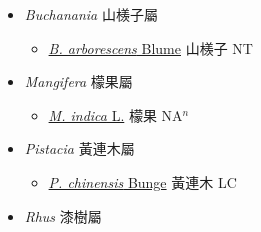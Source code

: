 
  \begin{itemize}
 \item[] \textit{Buchanania} 山檨子屬
                    
  \begin{itemize}
        \item[] \href{http://www.theplantlist.org/tpl1.1/search?q=Buchanania+arborescens}{\textit{B. arborescens} Blume}   山檨子 NT
  \end{itemize}
 \item[] \textit{Mangifera} 檬果屬
                    
  \begin{itemize}
        \item[] \href{http://www.theplantlist.org/tpl1.1/search?q=Mangifera+indica}{\textit{M. indica} L.}   檬果 NA$^n$
  \end{itemize}
 \item[] \textit{Pistacia} 黃連木屬
                    
  \begin{itemize}
        \item[] \href{http://www.theplantlist.org/tpl1.1/search?q=Pistacia+chinensis}{\textit{P. chinensis} Bunge}   黃連木 LC
  \end{itemize}
 \item[] \textit{Rhus} 漆樹屬
                    

\end{itemize}
